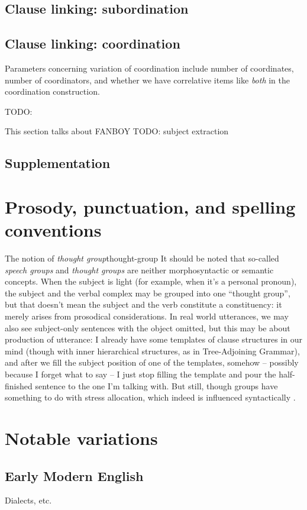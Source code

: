 \documentclass[UTF8, a4paper, oneside, scheme=plain, 12pt]{ctexbook}
\newcommand*{\citepage}[1]{p.~{#1}}
\newcommand*{\term}[1]{\emph{#1}}
\newcommand{\form}[1]{\emph{#1}}
\begin{document}
\section{Clause linking: subordination}\label{sec:clause-linking.subordination}



\section{Clause linking: coordination}\label{sec:clause-linking.coordination}

Parameters concerning variation of coordination 
include number of coordinates, 
number of coordinators,
and whether we have correlative items like \form{both} in the coordination construction.

TODO: \citet[\citepage{1276}]{cgel}

This section talks about FANBOY
TODO: subject extraction

\section{Supplementation}\label{sec:clause-linking.supplementation}


\chapter{Prosody, punctuation, and spelling conventions}

\begin{infobox}{The notion of \term{thought group}}{thought-group}
    It should be noted that so-called \term{speech groups}
    and \term{thought groups}
    are neither morphosyntactic or semantic concepts.
    When the subject is light (for example, when it's a personal pronoun),
    the subject and the verbal complex may be grouped into one ``thought group'',
    but that doesn't mean the subject and the verb constitute a constituency:
    it merely arises from prosodical considerations.
    In real world utterances, 
    we may also see subject-only sentences with the object omitted,
    but this may be about production of utterance:
    I already have some templates of clause structures in our mind
    (though with inner hierarchical structures, as in Tree-Adjoining Grammar),
    and after we fill the subject position of one of the templates,
    somehow -- possibly because I forget what to say -- 
    I just stop filling the template and pour the half-finished sentence 
    to the one I'm talking with.
    But still, though groups have something to do with stress allocation,
    which indeed is influenced syntactically \citep[\citepage{7}]{kahnemuyipour2009syntax}. 
\end{infobox}

\chapter{Notable variations}

\section{Early Modern English}

Dialects, etc.




\end{document}
